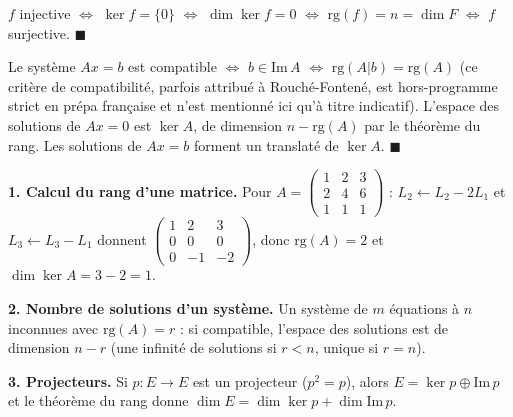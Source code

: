 
\begin{mdframed}[style=proofbar]
  $f$ injective $\Leftrightarrow$ $\ker f = \{0\}$ $\Leftrightarrow$ $\dim\ker f = 0$
  $\Leftrightarrow$ $\mathrm{rg}(f) = n = \dim F$ $\Leftrightarrow$ $f$ surjective. \hfill$\blacksquare$
\end{mdframed}


\begin{mdframed}[style=proofbar]
  Le système $Ax = b$ est compatible $\Leftrightarrow$ $b \in \mathrm{Im}\,A$
  $\Leftrightarrow$ $\mathrm{rg}(A|b) = \mathrm{rg}(A)$ (ce critère de compatibilité,
  parfois attribué à Rouché-Fontené, est hors-programme
  strict en prépa française et n'est mentionné ici qu'à titre indicatif).
  L'espace des solutions de $Ax = 0$ est $\ker A$, de dimension $n - \mathrm{rg}(A)$
  par le théorème du rang. Les solutions de $Ax = b$ forment un translaté de $\ker A$.
  \hfill$\blacksquare$
\end{mdframed}

\decsep{}



\begin{mdframed}[style=exbar, nobreak=true]
  \textbf{1. Calcul du rang d'une matrice.}\enspace%
  Pour $A = \begin{pmatrix}1&2&3\\2&4&6\\1&1&1\end{pmatrix}$ :
  $L_2 \leftarrow L_2-2L_1$ et $L_3\leftarrow L_3-L_1$ donnent
  $\begin{pmatrix}1&2&3\\0&0&0\\0&-1&-2\end{pmatrix}$, donc $\mathrm{rg}(A)=2$
  et $\dim\ker A = 3 - 2 = 1$.

  \smallskip\noindent
  \textbf{2. Nombre de solutions d'un système.}\enspace%
  Un système de $m$ équations à $n$ inconnues avec $\mathrm{rg}(A)=r$ :
  si compatible, l'espace des solutions est de dimension $n-r$
  (une infinité de solutions si $r < n$, unique si $r = n$).

  \smallskip\noindent
  \textbf{3. Projecteurs.}\enspace%
  Si $p : E \to E$ est un projecteur ($p^2 = p$), alors $E = \ker p \oplus \mathrm{Im}\,p$
  et le théorème du rang donne $\dim E = \dim\ker p + \dim\mathrm{Im}\,p$.
\end{mdframed}

